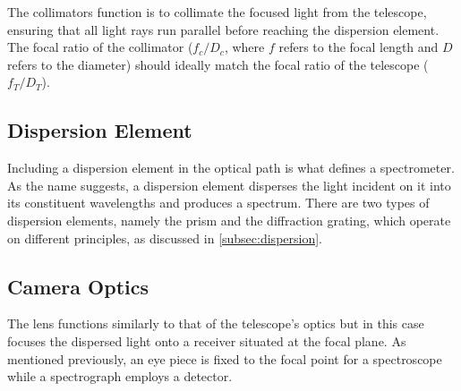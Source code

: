The collimators function is to collimate the focused light from the telescope, ensuring that all light rays run parallel before reaching the dispersion element. The focal ratio of the collimator ($f_{c} / D_{c}$, where $f$ refers to the focal length and $D$ refers to the diameter) should ideally match the focal ratio of the telescope ($f_{T} / D_{T}$).





\subsection{Dispersion Element}

Including a dispersion element in the optical path is what defines a spectrometer. As the name suggests, a dispersion element disperses the light incident on it into its constituent wavelengths and produces a spectrum. There are two types of dispersion elements, namely the prism and the diffraction grating, which operate on different principles, as discussed in \autoref{subsec:dispersion}.

\subsection{Camera Optics}

The lens functions similarly to that of the telescope's optics but in this case focuses the dispersed light onto a receiver situated at the focal plane. As mentioned previously, an eye piece is fixed to the focal point for a spectroscope while a spectrograph employs a detector.

